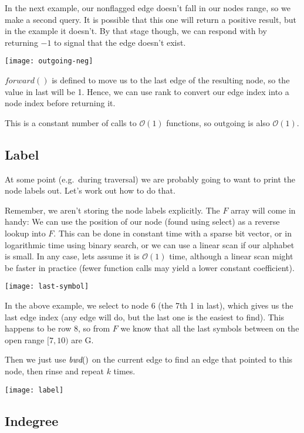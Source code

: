 In the next example, our nonflagged edge doesn't fall in our nodes range, so we make a second query. It is possible that this one will return a positive result, but in the example it doesn't. By that stage though, we can respond with by returning $-1$ to signal that the edge doesn't exist.

\medskip\centerline{\texttt{[image: outgoing-neg]}}\medskip

$\textit{forward}()$ is defined to move us to the last edge of the resulting node, so the value in last will be 1. Hence, we can use rank to convert our edge index into a node index before returning it.

This is a constant number of calls to $\mathcal{O}(1)$ functions, so outgoing is also $\mathcal{O}(1)$.

\subsection{Label}\label{bl-sec:lab}

At some point (e.g.\ during traversal) we are probably going to want to print the node labels out. Let's work out how to do that.

Remember, we aren't storing the node labels explicitly. The $F$ array will come in handy: We can use the position of our node (found using select) as a reverse lookup into $F$. This can be done in constant time with a sparse bit vector, or in logarithmic time using binary search, or we can use a linear scan if our alphabet is small. In any case, lets assume it is $\mathcal{O}(1)$ time, although a linear scan might be faster in practice (fewer function calls may yield a lower constant coefficient).

\medskip\centerline{\texttt{[image: last-symbol]}}\medskip

In the above example, we select to node 6 (the 7th 1 in last), which gives us the last edge index (any edge will do, but the last one is the easiest to find). This happens to be row 8, so from $F$ we know that all the last symbols between on the open range $[7,10)$ are G.

Then we just use $\textit{bwd}()$ on the current edge to find an edge that pointed to this node, then rinse and repeat $k$ times.

\medskip\centerline{\texttt{[image: label]}}\medskip

\subsection{Indegree}\label{bl-sec:ind}

